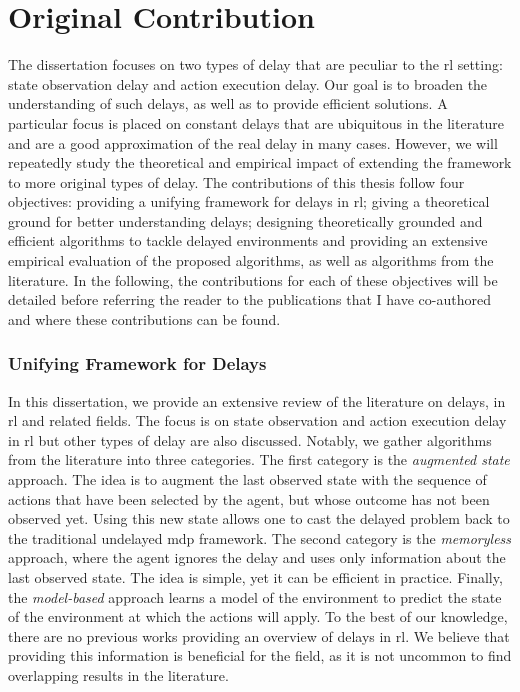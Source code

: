 \section{Original Contribution}

The dissertation focuses on two types of delay that are peculiar to the \gls{rl} setting: state observation delay and action execution delay. 
Our goal is to broaden the understanding of such delays, as well as to provide efficient solutions. 
A particular focus is placed on constant delays that are ubiquitous in the literature and are a good approximation of the real delay in many cases.
However, we will repeatedly study the theoretical and empirical impact of extending the framework to more original types of delay.
The contributions of this thesis follow four objectives: providing a unifying framework for delays in \gls{rl}; giving a theoretical ground for better understanding delays; designing theoretically grounded and efficient algorithms to tackle delayed environments and providing an extensive empirical evaluation of the proposed algorithms, as well as algorithms from the literature.
In the following, the contributions for each of these objectives will be detailed before referring the reader to the publications that I have co-authored and where these contributions can be found.

\subsubsection{Unifying Framework for Delays}
In this dissertation, we provide an extensive review of the literature on delays, in \gls{rl} and related fields.
The focus is on state observation and action execution delay in \gls{rl} but other types of delay are also discussed.
Notably, we gather algorithms from the literature into three categories.
The first category is the \emph{augmented state} approach. 
The idea is to augment the last observed state with the sequence of actions that have been selected by the agent, but whose outcome has not been observed yet.
Using this new state allows one to cast the delayed problem back to the traditional undelayed \gls{mdp} framework.
The second category is the \emph{memoryless} approach, where the agent ignores the delay and uses only information about the last observed state.
The idea is simple, yet it can be efficient in practice.
Finally, the \emph{model-based} approach learns a model of the environment to predict the state of the environment at which the actions will apply.
To the best of our knowledge, there are no previous works providing an overview of delays in \gls{rl}. 
We believe that providing this information is beneficial for the field, as it is not uncommon to find overlapping results in the literature.

